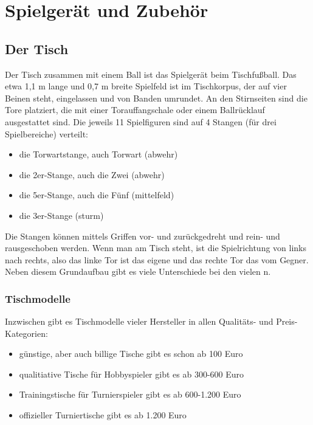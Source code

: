 \chapter{Spielgerät und Zubehör}
\label{tisch}


\section{Der Tisch}
\label{tisch:tisch}

Der Tisch zusammen mit einem Ball ist das Spielgerät beim Tischfußball. 
Das etwa 1,1 m lange und 0,7 m breite Spielfeld ist im Tischkorpus, der auf vier Beinen steht, eingelassen und von Banden umrundet. An den Stirnseiten sind die Tore platziert, die mit einer Torauffangschale oder einem Ballrücklauf ausgestattet sind.  
Die jeweils 11 Spielfiguren sind auf 4 Stangen (für drei Spielbereiche) verteilt:
\begin{itemize}  
\item die Torwartstange, auch Torwart (\gls{abwehr}) 
\item die 2er-Stange, auch die Zwei (\gls{abwehr}) 
\item die 5er-Stange, auch die Fünf (\gls{mittelfeld})
\item die 3er-Stange (\gls{sturm})
\end{itemize}  
Die Stangen können mittels Griffen vor- und zurückgedreht und rein- und rausgeschoben werden.
Wenn man am Tisch steht, ist die Spielrichtung von links nach rechts, also das linke Tor ist das eigene und das rechte Tor das vom Gegner.
Neben diesem Grundaufbau gibt es viele Unterschiede bei den vielen n. 

\subsection{Tischmodelle}
\label{tisch:tisch:modelle}

Inzwischen gibt es Tischmodelle vieler Hersteller in allen Qualitäts- und Preis-Kategorien:
\begin{itemize}
\item günstige, aber auch billige Tische gibt es schon ab 100 Euro 
\item qualitiative Tische für Hobbyspieler gibt es ab 300-600 Euro
\item Trainingstische für Turnierspieler gibt es ab 600-1.200 Euro
\item offizieller Turniertische gibt es ab 1.200 Euro 
\end{itemize}

